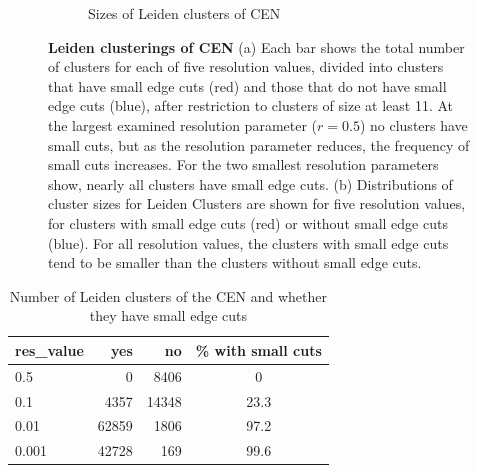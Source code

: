 \documentclass[11pt]{article}   	%
\begin{document}
\begin{figure}[H]
\begin{subfigure}[t]{0.45\textwidth}
\begin{center}
\caption{Sizes of Leiden clusters of CEN}
\end{center}
\label{fig:cenistouched-part2}
\end{subfigure}
\caption{\textbf {Leiden clusterings of CEN} (a) 
Each bar shows the total number of clusters for each of five resolution values, divided into clusters that have small edge cuts (red)  and those that do not have small edge cuts (blue), after restriction  to clusters of size at least 11. At the largest examined resolution parameter ($r=0.5$) no clusters have small cuts, but  as the resolution parameter reduces, the frequency of  small cuts increases.
For the two smallest resolution parameters show, nearly all clusters have small edge cuts.
(b)  Distributions of cluster sizes  for Leiden Clusters are shown for five resolution values, for clusters with small edge cuts (red) or without small edge cuts (blue). For all resolution values, the clusters with small edge cuts tend to be smaller than the clusters without small edge cuts.}
\end{figure}

 

\begin{table}[ht]
\centering
\begin{tabular}{lrrc}
  \hline
res\_value  & yes & no & \% with small cuts\\
  \hline
  0.5 & 0  & 8406  & 0\\ 
  0.1 & 4357 & 14348 & 23.3\\ 
    0.01 & 62859 & 1806 & 97.2\\ 
  0.001 & 42728 & 169 & 99.6 \\ 
   \hline
\end{tabular}
\caption{Number of Leiden clusters of the CEN and whether they have small edge cuts}
\end{table}
\end{document}
